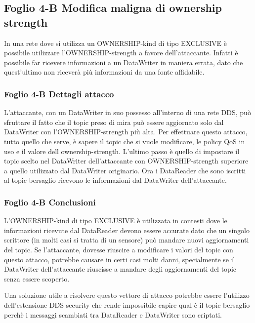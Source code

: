 



\subsection{Foglio 4-B Modifica maligna di ownership strength}
In una rete dove si utilizza un OWNERSHIP-kind di tipo EXCLUSIVE è possibile
utilizzare l'OWNERSHIP-strength a favore
dell'attaccante. Infatti è possibile far ricevere informazioni a un DataWriter
in maniera errata, dato che quest'ultimo non riceverà più informazioni da
una fonte affidabile.\cite{DBLP:conf/malware/MichaudDL18}


\subsubsection{Foglio 4-B Dettagli attacco}
L'attaccante, con un DataWriter in suo possesso all'interno di una rete DDS,
può sfruttare il fatto che il topic preso di mira può essere aggiornato
solo dal DataWriter con l'OWNERSHIP-strength più alta.
Per effettuare questo attacco, tutto quello che serve, è sapere il topic che
si vuole modificare, le policy QoS in uso e il valore dell ownership-strength.
L'ultimo passo è quello di impostare il topic scelto nel DataWriter
dell'attaccante con OWNERSHIP-strength superiore a quello utilizzato dal
DataWriter originario.
Ora i DataReader che sono iscritti al topic bersaglio
ricevono le informazioni dal DataWriter dell'attaccante.
\cite{DBLP:conf/malware/MichaudDL18}


\subsubsection{Foglio 4-B Conclusioni}
L'OWNERSHIP-kind di tipo EXCLUSIVE è utilizzata in contesti dove le
informazioni ricevute dal DataReader devono essere accurate dato che un singolo
scrittore (in molti casi si tratta di un sensore) può mandare nuovi aggiornamenti
del topic. Se l'attaccante, dovesse riuscire a modificare i valori del topic con
questo attacco, potrebbe causare in certi casi molti danni,
specialmente se il DataWriter dell'attaccante riuscisse a mandare degli aggiornamenti
del topic senza essere scoperto.
\cite{DBLP:conf/malware/MichaudDL18}

Una soluzione utile a risolvere questo vettore di attacco potrebbe essere l'utilizzo
dell'estensione DDS security che rende impossibile capire qual è il topic bersaglio
perchè i messaggi scambiati tra DataReader e DataWriter sono criptati.


